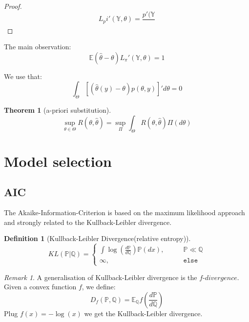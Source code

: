\documentclass[a4paper,12pt, oneside, fleqn]{book}
\newtheorem{theorem}{Theorem}[section]
\theoremstyle{definition}
\newtheorem{definition}{Definition}[section]
\theoremstyle{remark}
\newtheorem*{remark}{Remark}
\begin{document}
\begin{proof}
	\begin{equation*}
		L_pi'(\mathbb{Y}, \theta) = \frac{p'(\mathbb{Y}}{}
	\end{equation*}
\end{proof}

The main observation:
\begin{equation*}
	\mathbb{E}(\hat{\theta} - \theta) L_\pi'(\mathbb{Y}, \theta) = 1
\end{equation*}

We use that:
\begin{equation*}
	\int_\Theta [(\hat{\theta}(y) - \theta) p(\theta, y)]' d\theta = 0
\end{equation*}

\begin{theorem}[a-priori substitution]
\begin{equation}
\sup_{\theta \in \Theta} R(\theta, \hat{\theta}) = \sup_{\Pi} \int_{\Theta} R(\theta, \hat{\theta}) \Pi(d\theta)
\end{equation}
\end{theorem}



\section{Model selection}
\subsection{AIC}
The Akaike-Information-Criterion is based on the maximum likelihood approach and strongly related to the Kullback-Leibler divergence. 
\begin{definition}[Kullback-Leibler Divergence(relative entropy)]
\begin{equation}
    KL(\mathbb{P}|\mathbb{Q}) = 
    \left\{\begin{aligned}
    \int \log(\frac{d\mathbb{P}}{d\mathbb{Q}})\mathbb{P}(dx),\qquad & \mathbb{P} \ll \mathbb{Q}\\
    \infty,\qquad & \texttt{else}
    \end{aligned}\right.
\end{equation}
\end{definition}

\begin{remark}
	A generalisation of Kullback-Leibler divergence is the $f$-$divergence$. Given a convex function $f$, we define:
\begin{equation*}
	D_f(\mathbb{P}, \mathbb{Q}) = \mathbb{E}_\mathbb{Q} f( \frac{d\mathbb{P}}{d\mathbb{Q}} )
\end{equation*}
Plug $f(x) = -\log(x)$ we get the Kullback-Leibler divergence.
\end{remark}
\end{document}
